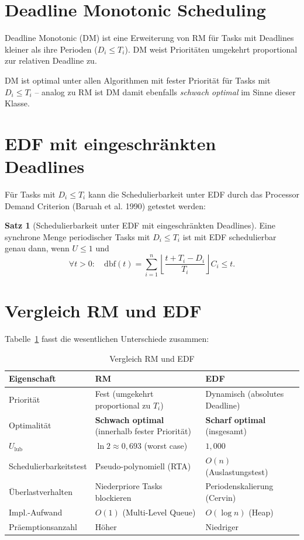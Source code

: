 ﻿\documentclass[a4paper,12pt]{report}
\theoremstyle{definition}
\newtheorem{satz}{Satz}[chapter]
\begin{document}
\section{Deadline Monotonic Scheduling}

Deadline Monotonic (DM) ist eine Erweiterung von RM für Tasks mit Deadlines
kleiner als ihre Perioden ($D_i \leq T_i$). DM weist Prioritäten umgekehrt
proportional zur relativen Deadline zu.

DM ist optimal unter allen Algorithmen mit fester Priorität für Tasks mit
$D_i \leq T_i$ -- analog zu RM ist DM damit ebenfalls \emph{schwach optimal}
im Sinne dieser Klasse.

\section{EDF mit eingeschränkten Deadlines}

Für Tasks mit $D_i \leq T_i$ kann die Schedulierbarkeit unter EDF durch das
Processor Demand Criterion (Baruah et al. 1990) getestet werden:

\begin{satz}[Schedulierbarkeit unter EDF mit eingeschränkten Deadlines]
	Eine synchrone Menge periodischer Tasks mit $D_i \leq T_i$ ist mit EDF
	schedulierbar genau dann, wenn $U \leq 1$ und
	\[
		\forall t > 0: \quad \mathrm{dbf}(t) = \sum_{i=1}^{n} \left\lfloor \frac{t + T_i - D_i}{T_i} \right\rfloor C_i \leq t.
	\]
\end{satz}

\section{Vergleich RM und EDF}

Tabelle~\ref{tab:rm_edf} fasst die wesentlichen Unterschiede zusammen:

\begin{table}[H]
	\centering
	\caption{Vergleich RM und EDF}
	\label{tab:rm_edf}
	\begin{tabular}{p{4cm}p{5cm}p{5cm}}
		\toprule
		\textbf{Eigenschaft} & \textbf{RM} & \textbf{EDF} \\
		\midrule
		Priorität            & Fest (umgekehrt proportional zu $T_i$) & Dynamisch (absolutes Deadline) \\
		Optimalität          & \textbf{Schwach optimal} (innerhalb fester Priorität) & \textbf{Scharf optimal} (insgesamt) \\
		$U_{\text{lub}}$     & $\ln 2 \approx 0{,}693$ (worst case) & $1{,}000$ \\
		Schedulierbarkeitstest & Pseudo-polynomiell (RTA) & $O(n)$ (Auslastungstest) \\
		Überlastverhalten    & Niederpriore Tasks blockieren & Periodenskalierung (Cervin) \\
		Impl.-Aufwand & $O(1)$ (Multi-Level Queue) & $O(\log n)$ (Heap) \\
		Präemptionsanzahl    & Höher & Niedriger \\
		\bottomrule
	\end{tabular}
\end{table}
\end{document}
